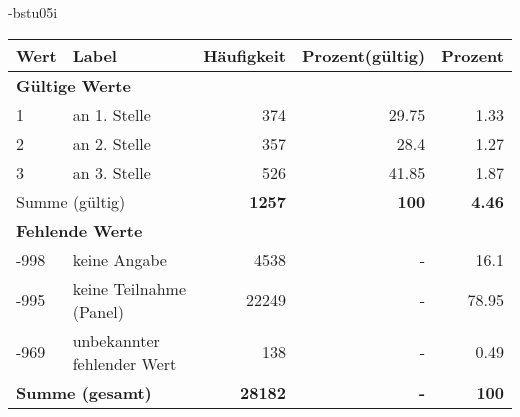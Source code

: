                 \vspace*{-\baselineskip}
					\begin{filecontents}{\jobname-bstu05i}
					\begin{longtable}{lXrrr}
					\toprule
					\textbf{Wert} & \textbf{Label} & \textbf{Häufigkeit} & \textbf{Prozent(gültig)} & \textbf{Prozent} \\
					\endhead
					\midrule
					\multicolumn{5}{l}{\textbf{Gültige Werte}}\\

					1 &
					\multicolumn{1}{X}{ an 1. Stelle   } &


					  \num{374} &
					  \num[round-mode=places,round-precision=2]{29.75} &
					    \num[round-mode=places,round-precision=2]{1.33} \\

					2 &
					\multicolumn{1}{X}{ an 2. Stelle   } &


					  \num{357} &
					  \num[round-mode=places,round-precision=2]{28.4} &
					    \num[round-mode=places,round-precision=2]{1.27} \\

					3 &
					\multicolumn{1}{X}{ an 3. Stelle   } &


					  \num{526} &
					  \num[round-mode=places,round-precision=2]{41.85} &
					    \num[round-mode=places,round-precision=2]{1.87} \\
					\midrule
					\multicolumn{2}{l}{Summe (gültig)} &
					  \textbf{\num{1257}} &
					\textbf{100} &
					  \textbf{\num[round-mode=places,round-precision=2]{4.46}} \\
					\multicolumn{5}{l}{\textbf{Fehlende Werte}}\\
							-998 &
							keine Angabe &
							  \num{4538} &
							 - &
							  \num[round-mode=places,round-precision=2]{16.1} \\
							-995 &
							keine Teilnahme (Panel) &
							  \num{22249} &
							 - &
							  \num[round-mode=places,round-precision=2]{78.95} \\
							-969 &
							unbekannter fehlender Wert &
							  \num{138} &
							 - &
							  \num[round-mode=places,round-precision=2]{0.49} \\
					\midrule
					\multicolumn{2}{l}{\textbf{Summe (gesamt)}} &
				      \textbf{\num{28182}} &
				    \textbf{-} &
				    \textbf{100} \\
					\bottomrule
					\end{longtable}
					\end{filecontents}
